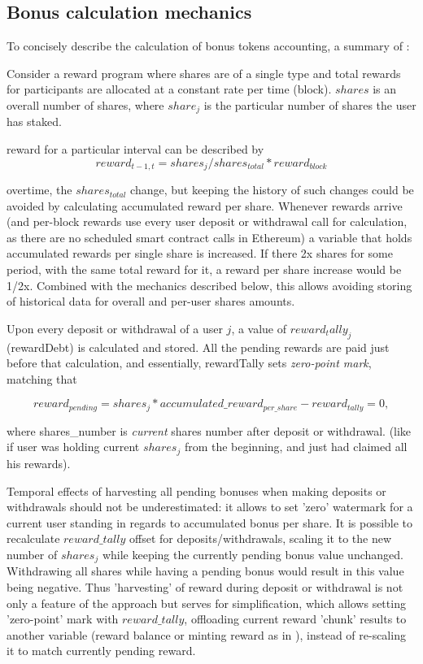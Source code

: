 \documentclass[12pt]{article}
\begin{document}
\subsection{Bonus calculation mechanics}
\label{subsec:bonus_calculation}

To concisely describe the calculation of bonus tokens accounting, a summary of \cite{batog,solmaz}:

Consider a reward program where shares are of a single type and total rewards for participants are allocated at a constant rate per time (block). $shares$ is an overall number of shares, where $share_{j}$ is the particular number of shares the user has staked.

reward for a particular interval can be described by
\begin{equation}
	reward_{t-1,t} = shares_{j}/shares_{\mathit{total}} * reward_{\mathit{block}}
\end{equation}

overtime, the $shares_{\mathit{total}}$ change, but keeping the history of such changes could be avoided by calculating accumulated reward per share. Whenever rewards arrive (and per-block rewards use every user deposit or withdrawal call for calculation, as there are no scheduled smart contract calls in Ethereum) a variable that holds accumulated rewards per single share is increased. If there 2x shares for some period, with the same total reward for it, a reward per share increase would be 1/2x. Combined with the mechanics described below, this allows avoiding storing of historical data for overall and per-user shares amounts.

Upon every deposit or withdrawal of a user $j$, a value of $reward_tally_{j}$ (rewardDebt) is calculated and stored. All the pending rewards are paid just before that calculation, and essentially, rewardTally sets \emph{zero-point mark}, matching that

\begin{equation}
	reward_{\mathit{pending}} = shares_{j} * accumulated\_reward_{\mathit{per\_share}} - reward_{\mathit{tally}} = 0,
\end{equation}

where shares\_number is \emph{current} shares number after deposit or withdrawal.
(like if user was holding current $shares_{j}$ from the beginning, and just had claimed all his rewards).

Temporal effects of harvesting all pending bonuses when making deposits or withdrawals should not be underestimated: it allows to set 'zero' watermark for a current user standing in regards to accumulated bonus per share. It is possible to recalculate $reward\_tally$ offset for deposits/withdrawals, scaling it to the new number of $shares_{j}$ while keeping the currently pending bonus value unchanged. Withdrawing all shares while having a pending bonus would result in this value being negative.
Thus 'harvesting' of reward during deposit or withdrawal is not only a feature of the approach but serves for simplification, which allows setting 'zero-point' mark with $reward\_tally$, offloading current reward 'chunk' results to another variable (reward balance or minting reward as in \cite{sushichef}), instead of re-scaling it to match currently pending reward.
\end{document}
